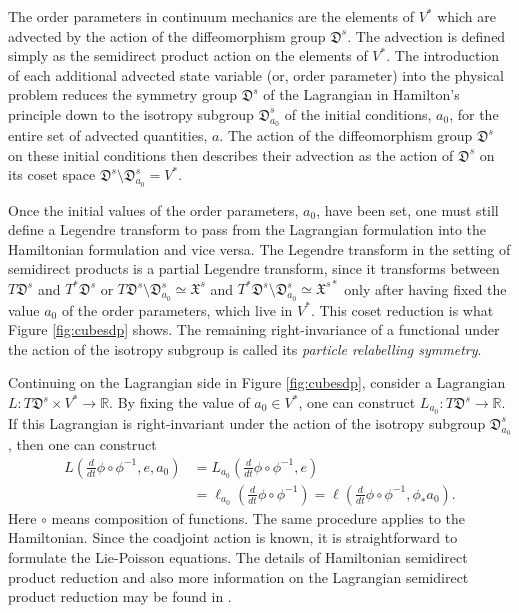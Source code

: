 \documentclass[11pt, oneside]{article}   	%
\numberwithin{equation}{section}
\theoremstyle{plain}
\theoremstyle{definition}
\theoremstyle{remark}
\newcommand{\<}{\langle}
\renewcommand{\>}{\rangle}
\begin{document}
The order parameters in continuum mechanics are the elements of $V^*$ which are advected by the action of the diffeomorphism group $\mathfrak{D}^s$. The advection is defined simply as the semidirect product action on the elements of $V^*$. The introduction of each additional advected state variable (or, order parameter) into the physical problem reduces the symmetry group $\mathfrak{D}^s$ of the Lagrangian in Hamilton's principle down to the isotropy subgroup $\mathfrak{D}^s_{a_0}$ of the initial conditions, $a_0$, for the entire set of advected quantities, $a$. The action of the diffeomorphism group $\mathfrak{D}^s$ on these initial conditions then describes their advection as the action of $\mathfrak{D}^s$ on its coset space $\mathfrak{D}^s\setminus\mathfrak{D}^s_{a_0}=V^*$. 
 
 Once the initial values of the order parameters, $a_0$,  have been set, one must still define a Legendre transform to pass from the Lagrangian formulation into the Hamiltonian formulation and vice versa. The Legendre transform in the setting of semidirect products is a partial Legendre transform, since it transforms between $T\mathfrak{D}^s$ and $T^*\mathfrak{D}^s$ or $T\mathfrak{D}^s\setminus\mathfrak{D}^s_{a_0} \simeq \mathfrak{X}^s$ and $T^*\mathfrak{D}^s\setminus\mathfrak{D}^s_{a_0} \simeq\mathfrak{X}^{s*}$ only after having fixed the value $a_0$ of the order parameters, which live in $V^*$. This coset reduction is what Figure \ref{fig:cubesdp} shows. The remaining right-invariance of a functional under the action of the isotropy subgroup is called its \emph{particle relabelling symmetry}.

Continuing on the Lagrangian side in Figure \ref{fig:cubesdp}, consider a Lagrangian $L:T\mathfrak{D}^s\times V^*\to\mathbb{R}$. By fixing the value of $a_0\in V^*$, one can construct $L_{a_0}:T\mathfrak{D}^s\to\mathbb{R}$. If this Lagrangian is right-invariant under the action of the isotropy subgroup $\mathfrak{D}_{a_0}^s$, then one can construct 
\begin{equation}
\begin{aligned}
L\left(\frac{d}{dt}\phi\circ \phi^{-1},e,a_0\right) &= L_{a_0}\left(\frac{d}{dt}\phi\circ \phi^{-1},e\right)\\
&= \ell_{a_0}\left(\frac{d}{dt}\phi\circ \phi^{-1}\right) = \ell\left(\frac{d}{dt}\phi\circ \phi^{-1}, \phi_*a_0\right).
\end{aligned}
\label{eq:lagrangians}
\end{equation}
Here $\circ$ means composition of functions. The same procedure applies to the Hamiltonian. Since the coadjoint action is known, it is straightforward to formulate the Lie-Poisson equations. The details of Hamiltonian semidirect product reduction and also more information on the Lagrangian semidirect product reduction may be found in \cite{holm1998euler,HolmGM2025}. 
\end{document}

